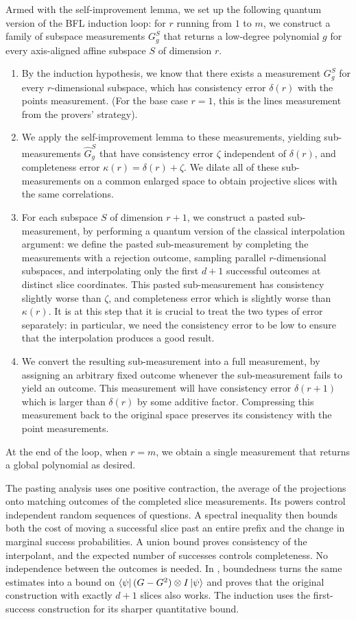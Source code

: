 \documentclass[11pt]{article}
\theoremstyle{definition}
\begin{document}
Armed with the self-improvement lemma, we set up the following
quantum version of the BFL
induction loop: for $r$ running from $1$ to $m$, we construct a family
of subspace measurements $G^{S}_{g}$ that returns a low-degree
polynomial $g$ for every axis-aligned affine subspace $S$ of dimension $r$.
\begin{enumerate}
  \item By the induction hypothesis, we know that there exists a
    measurement  $G^{S}_{g}$ for every $r$-dimensional subspace, which
    has consistency error $\delta(r)$ with the points
    measurement. (For the base case $r = 1$, this is the lines
    measurement from the provers' strategy).
  \item We apply the self-improvement lemma to these measurements, yielding
    sub-measurements $\hat{G}^{S}_{g}$ that have consistency error
    $\zeta$ independent of $\delta(r)$, and completeness error $\kappa(r) = \delta(r) + \zeta$.
    We dilate all of these sub-measurements on a common enlarged space
    to obtain projective slices with the same correlations.
  \item For each subspace $S$ of dimension $r+1$, we construct a
    pasted sub-measurement, by performing a quantum version of the
    classical interpolation argument: we define the pasted
    sub-measurement by completing the measurements with a rejection
    outcome, sampling parallel $r$-dimensional subspaces, and
    interpolating only the first $d+1$ successful outcomes at distinct
    slice coordinates. This pasted sub-measurement has consistency slightly worse than $\zeta$, and completeness error which
    is slightly worse than $\kappa(r)$. It is at this step that it is crucial to treat the two types
    of error separately: in particular, we need the consistency error
    to be low to ensure that the interpolation produces a good result.
  \item We convert the resulting sub-measurement into a full
    measurement, by assigning an arbitrary fixed outcome whenever the
    sub-measurement fails to yield an outcome. This measurement will
    have consistency error $\delta(r+1)$ which is larger than $\delta(r)$
    by some additive factor.  Compressing this measurement back to the
    original space preserves its consistency with the point measurements.
  \end{enumerate}
  At the end of the loop, when $r = m$, we obtain a single measurement that returns
  a global polynomial as desired.

The pasting analysis uses one positive contraction, the average of the
projections onto matching outcomes of the completed slice measurements.
Its powers control independent random sequences of questions.  A
spectral inequality then bounds both the cost of moving a successful
slice past an entire prefix and the change in marginal success
probabilities.  A union bound proves consistency of the interpolant,
and the expected number of successes controls completeness.  No
independence between the outcomes is needed.  In , boundedness turns the same
estimates into a bound on $\bra\psi(G-G^2)\otimes I\ket\psi$ and proves
that the original construction with exactly $d+1$ slices also works.
The induction uses the first-success construction for its sharper
quantitative bound.
\end{document}
